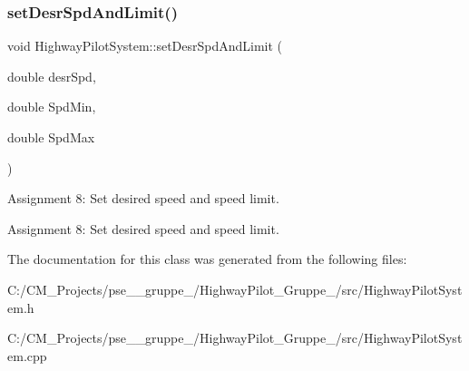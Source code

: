 \subsubsection{\texorpdfstring{setDesrSpdAndLimit()}{setDesrSpdAndLimit()}}
{\footnotesize\ttfamily void Highway\+Pilot\+System\+::set\+Desr\+Spd\+And\+Limit (\begin{DoxyParamCaption}\item[{double}]{desr\+Spd,  }\item[{double}]{Spd\+Min,  }\item[{double}]{Spd\+Max }\end{DoxyParamCaption})}



Assignment 8\+: Set desired speed and speed limit. 

Assignment 8\+: Set desired speed and speed limit.

The documentation for this class was generated from the following files\+:\begin{DoxyCompactItemize}
\item 
C\+:/\+C\+M\+\_\+\+Projects/pse\+\_\+\_\+gruppe\+\_/\+Highway\+Pilot\+\_\+\+Gruppe\+\_/src/Highway\+Pilot\+System.\+h\item 
C\+:/\+C\+M\+\_\+\+Projects/pse\+\_\+\_\+gruppe\+\_/\+Highway\+Pilot\+\_\+\+Gruppe\+\_/src/Highway\+Pilot\+System.\+cpp\end{DoxyCompactItemize}

